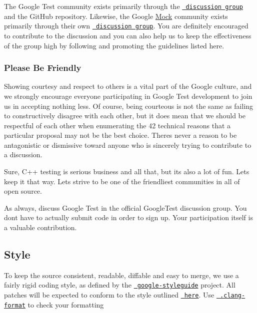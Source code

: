 The Google Test community exists primarily through the \href{http://groups.google.com/group/googletestframework}{\texttt{ discussion group}} and the Git\+Hub repository. Likewise, the Google \mbox{\hyperlink{class_mock}{Mock}} community exists primarily through their own \href{http://groups.google.com/group/googlemock}{\texttt{ discussion group}}. You are definitely encouraged to contribute to the discussion and you can also help us to keep the effectiveness of the group high by following and promoting the guidelines listed here.

\subsubsection*{Please Be Friendly}

Showing courtesy and respect to others is a vital part of the Google culture, and we strongly encourage everyone participating in Google Test development to join us in accepting nothing less. Of course, being courteous is not the same as failing to constructively disagree with each other, but it does mean that we should be respectful of each other when enumerating the 42 technical reasons that a particular proposal may not be the best choice. There\textquotesingle{}s never a reason to be antagonistic or dismissive toward anyone who is sincerely trying to contribute to a discussion.

Sure, C++ testing is serious business and all that, but it\textquotesingle{}s also a lot of fun. Let\textquotesingle{}s keep it that way. Let\textquotesingle{}s strive to be one of the friendliest communities in all of open source.

As always, discuss Google Test in the official Google\+Test discussion group. You don\textquotesingle{}t have to actually submit code in order to sign up. Your participation itself is a valuable contribution.

\subsection*{Style}

To keep the source consistent, readable, diffable and easy to merge, we use a fairly rigid coding style, as defined by the \href{https://github.com/google/styleguide}{\texttt{ google-\/styleguide}} project. All patches will be expected to conform to the style outlined \href{https://google.github.io/styleguide/cppguide.html}{\texttt{ here}}. Use \href{https://github.com/google/googletest/blob/master/.clang-format}{\texttt{ .clang-\/format}} to check your formatting

